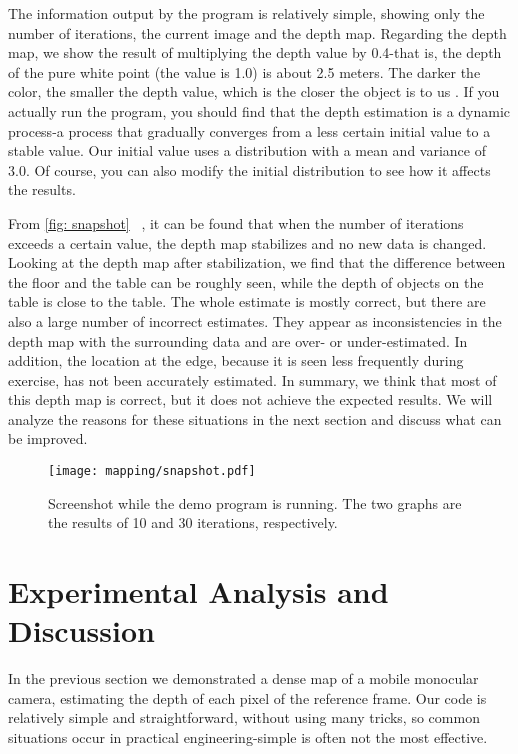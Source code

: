 \clearpage
The information output by the program is relatively simple, showing only the number of iterations, the current image and the depth map. Regarding the depth map, we show the result of multiplying the depth value by 0.4-that is, the depth of the pure white point (the value is 1.0) is about 2.5 meters. The darker the color, the smaller the depth value, which is the closer the object is to us . If you actually run the program, you should find that the depth estimation is a dynamic process-a process that gradually converges from a less certain initial value to a stable value. Our initial value uses a distribution with a mean and variance of 3.0. Of course, you can also modify the initial distribution to see how it affects the results.

From \autoref{fig: snapshot} ~, it can be found that when the number of iterations exceeds a certain value, the depth map stabilizes and no new data is changed. Looking at the depth map after stabilization, we find that the difference between the floor and the table can be roughly seen, while the depth of objects on the table is close to the table. The whole estimate is mostly correct, but there are also a large number of incorrect estimates. They appear as inconsistencies in the depth map with the surrounding data and are over- or under-estimated. In addition, the location at the edge, because it is seen less frequently during exercise, has not been accurately estimated. In summary, we think that most of this depth map is correct, but it does not achieve the expected results. We will analyze the reasons for these situations in the next section and discuss what can be improved.

\begin{figure}[! ht]
\centering
\texttt{[image: mapping/snapshot.pdf]}
\caption{Screenshot while the demo program is running. The two graphs are the results of 10 and 30 iterations, respectively. }
\label{fig: snapshot}
\end{figure}

\clearpage
\section{Experimental Analysis and Discussion}
In the previous section we demonstrated a dense map of a mobile monocular camera, estimating the depth of each pixel of the reference frame. Our code is relatively simple and straightforward, without using many tricks, so common situations occur in practical engineering-simple is often not the most effective.


